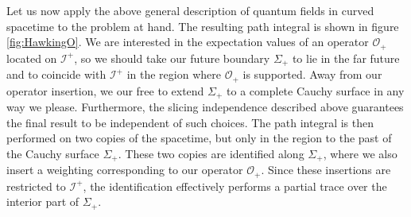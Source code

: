 \documentclass[letterpaper,12pt]{article}
\newcommand*{\scri}{\mathscr{I}} %
\begin{document}
Let us now apply the above general description of quantum fields in curved spacetime to the problem at hand.  The resulting path integral is shown in figure \ref{fig:HawkingO}. We are interested in the expectation values of an operator $\mathcal{O}_+$ located on $\scri^+$, so we should take our future boundary $\Sigma_+$ to lie in the far future and to coincide with $\scri^+$ in the region where $\mathcal{O}_+$ is supported. Away from our operator insertion, we our free to extend $\Sigma_+$ to a complete Cauchy surface in any way we please.  Furthermore,  the slicing independence described above guarantees the final result to be independent of such choices. The path integral is then performed on two copies of the spacetime, but only in the region to the past of the Cauchy surface $\Sigma_+$. These two copies are identified along $\Sigma_+$, where we also insert a weighting corresponding to our operator $\mathcal{O}_+$. Since these insertions are restricted to $\scri^+$, the identification effectively performs a partial trace over the interior part of $\Sigma_+$.
\end{document}
